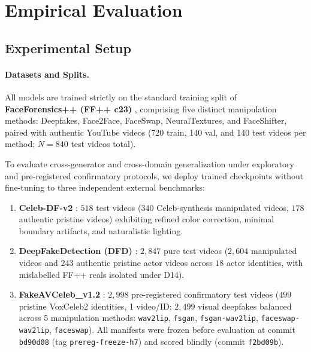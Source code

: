 \section{Empirical Evaluation}
\label{sec:experiments}

\subsection{Experimental Setup}
\paragraph{Datasets and Splits.}
All models are trained strictly on the standard training split of \textbf{FaceForensics++ (FF++ c23)} \citep{rossler2019faceforensics}, comprising five distinct manipulation methods: Deepfakes, Face2Face, FaceSwap, NeuralTextures, and FaceShifter, paired with authentic YouTube videos (720 train, 140 val, and 140 test videos per method; $N=840$ test videos total).

To evaluate cross-generator and cross-domain generalization under exploratory and pre-registered confirmatory protocols, we deploy trained checkpoints without fine-tuning to three independent external benchmarks:
\begin{enumerate}[leftmargin=*]
    \item \textbf{Celeb-DF-v2} \citep{li2020celeb}: $518$ test videos ($340$ Celeb-synthesis manipulated videos, $178$ authentic pristine videos) exhibiting refined color correction, minimal boundary artifacts, and naturalistic lighting.
    \item \textbf{DeepFakeDetection (DFD)} \citep{dufour2019deepfakedetection}: $2{,}847$ pure test videos ($2{,}604$ manipulated videos and $243$ authentic pristine actor videos across $18$ actor identities, with mislabelled FF++ reals isolated under D14).
    \item \textbf{FakeAVCeleb\_v1.2} \citep{khalid2021fakeavceleb}: $2{,}998$ pre-registered confirmatory test videos ($499$ pristine VoxCeleb2 identities, 1 video/ID; $2{,}499$ visual deepfakes balanced across 5 manipulation methods: \texttt{wav2lip}, \texttt{fsgan}, \texttt{fsgan-wav2lip}, \texttt{faceswap-wav2lip}, \texttt{faceswap}). All manifests were frozen before evaluation at commit \texttt{bd90d08} (tag \texttt{prereg-freeze-h7}) and scored blindly (commit \texttt{f2bd09b}).
\end{enumerate}

